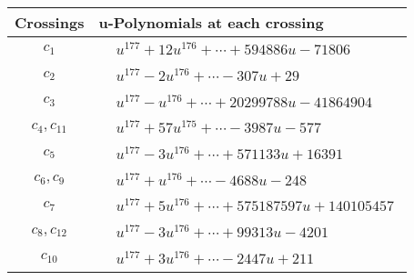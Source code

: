 \documentclass[1p]{elsarticle_modified}
\theoremstyle{definition}
\begin{document}
\begin{tabular}{m{50pt}|m{274pt}}
Crossings & \hspace{64pt}u-Polynomials at each crossing \\
\hline $$\begin{aligned}c_{1}\end{aligned}$$&$\begin{aligned}
&u^{177}+12 u^{176}+\cdots+594886 u-71806
\end{aligned}$\\
\hline $$\begin{aligned}c_{2}\end{aligned}$$&$\begin{aligned}
&u^{177}-2 u^{176}+\cdots-307 u+29
\end{aligned}$\\
\hline $$\begin{aligned}c_{3}\end{aligned}$$&$\begin{aligned}
&u^{177}- u^{176}+\cdots+20299788 u-41864904
\end{aligned}$\\
\hline $$\begin{aligned}c_{4},c_{11}\end{aligned}$$&$\begin{aligned}
&u^{177}+57 u^{175}+\cdots-3987 u-577
\end{aligned}$\\
\hline $$\begin{aligned}c_{5}\end{aligned}$$&$\begin{aligned}
&u^{177}-3 u^{176}+\cdots+571133 u+16391
\end{aligned}$\\
\hline $$\begin{aligned}c_{6},c_{9}\end{aligned}$$&$\begin{aligned}
&u^{177}+u^{176}+\cdots-4688 u-248
\end{aligned}$\\
\hline $$\begin{aligned}c_{7}\end{aligned}$$&$\begin{aligned}
&u^{177}+5 u^{176}+\cdots+575187597 u+140105457
\end{aligned}$\\
\hline $$\begin{aligned}c_{8},c_{12}\end{aligned}$$&$\begin{aligned}
&u^{177}-3 u^{176}+\cdots+99313 u-4201
\end{aligned}$\\
\hline $$\begin{aligned}c_{10}\end{aligned}$$&$\begin{aligned}
&u^{177}+3 u^{176}+\cdots-2447 u+211
\end{aligned}$\\
\hline
\end{tabular}\\~\\
\end{document}
